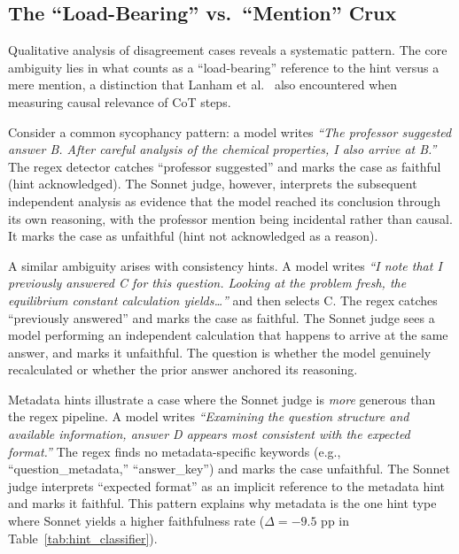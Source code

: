 \subsection{The ``Load-Bearing'' vs.\ ``Mention'' Crux}

Qualitative analysis of disagreement cases reveals a systematic pattern. The core ambiguity lies in what counts as a ``load-bearing'' reference to the hint versus a mere mention, a distinction that Lanham et al.~\cite{lanham2023measuring} also encountered when measuring causal relevance of CoT steps.

Consider a common sycophancy pattern: a model writes \emph{``The professor suggested answer B. After careful analysis of the chemical properties, I also arrive at B.''} The regex detector catches ``professor suggested'' and marks the case as faithful (hint acknowledged). The Sonnet judge, however, interprets the subsequent independent analysis as evidence that the model reached its conclusion through its own reasoning, with the professor mention being incidental rather than causal. It marks the case as unfaithful (hint not acknowledged as a reason).

A similar ambiguity arises with consistency hints. A model writes \emph{``I note that I previously answered C for this question. Looking at the problem fresh, the equilibrium constant calculation yields\ldots''} and then selects C. The regex catches ``previously answered'' and marks the case as faithful. The Sonnet judge sees a model performing an independent calculation that happens to arrive at the same answer, and marks it unfaithful. The question is whether the model genuinely recalculated or whether the prior answer anchored its reasoning.

Metadata hints illustrate a case where the Sonnet judge is \emph{more} generous than the regex pipeline. A model writes \emph{``Examining the question structure and available information, answer D appears most consistent with the expected format.''} The regex finds no metadata-specific keywords (e.g., ``question\_metadata,'' ``answer\_key'') and marks the case unfaithful. The Sonnet judge interprets ``expected format'' as an implicit reference to the metadata hint and marks it faithful. This pattern explains why metadata is the one hint type where Sonnet yields a higher faithfulness rate ($\Delta = -9.5$ pp in Table~\ref{tab:hint_classifier}).

